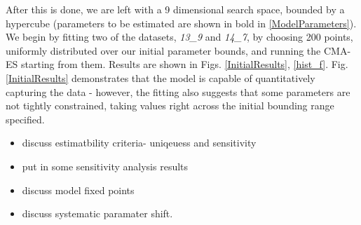 \documentclass[10pt,journal]{./IEEE_latex_class/IEEEtran}
\begin{document}
 After this is done, we are left with a 9 dimensional search space, bounded by a hypercube (parameters to be estimated are shown in bold in \ref{ModelParameters}). We begin by fitting two of the datasets, \textit{13\_9} and \textit{14\_7}, by choosing 200 points, uniformly distributed over our initial parameter bounds, and running the CMA-ES starting from them. Results are shown in Figs. \ref{InitialResults}, \ref{hist_f}. Fig. \ref{InitialResults} demonstrates that the model is capable of quantitatively capturing the data - however, the fitting also suggests that some parameters are not tightly constrained, taking values right across the initial bounding range specified. 
 
 \begin{itemize}
 \item discuss estimatbility criteria- uniqeuess and sensitivity
 \item put in some sensitivity analysis results
 \item discuss model fixed points
 \item discuss systematic paramater shift.
 \end{itemize}
 
\end{document}

